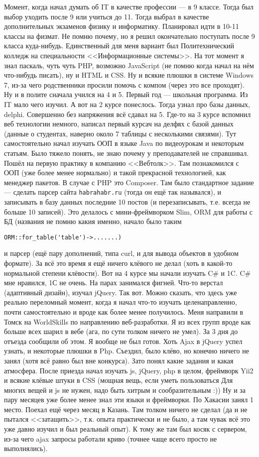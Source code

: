 Момент, когда начал думать об IT в качестве профессии --- в 9 классе. Тогда был выбор уходить после 9 или учиться до 11. Тогда выбрал в качестве дополнительных экзаменов физику и информатику.
Планировал идти в 10-11 классы на физмат. Не помню почему, но я решил окончательно поступать после 9 класса куда-нибудь. Единственный для меня вариант был Политехнический колледж на специальности <<Информационные системы>>.
На тот момент я знал паскаль, чуть чуть PHP, возможно JavaScript (не помню когда начал на нём что-нибудь писать), ну и HTML и CSS. Ну и всякие плюшки в системе Windows 7, из-за чего родственники просили помочь с компом (через это все проходят).
Ну и в полите сначала учился на 4 и 5. Первый год --- школьная программа. Из IT мало чего изучил. А вот на 2 курсе понеслось. Тогда узнал про базы данных, delphi.
Совершенно без напряжения всё сдавал на 5. Где-то на 3 курсе вспомнил веб технологии немного, написал первый курсач на делфях с базой данных (данные о студентах, наверно около 7 таблицы с несколькими связями).
Тут самостоятельно начал изучать ООП в языке Java по видеоурокам и некоторым статьям. Было тяжело понять, не знаю почему у преподавателей не справшивал.
Пошёл на первую практику в компанию <<Вебтолк>>. Там познакомился с ООП (уже более менее нормально) и такой прекрасной технологией, как менеджер пакетов. В случае с PHP это Composer.
Там было стандартное задание --- сделать парсер сайта \verb|habrahabr.ru| (тогда он ещё так назывался), и записывать в базу данных последние 10 постов (и перезаписывать, т.е. всегда не больше 10 записей).
Это делалось с мини-фреймворком Slim, ORM для работы с БД (названия не помню какия именно, начало было таким
\begin{verbatim}
ORM::for_table('table')->.......)
\end{verbatim}
и парсер (ещё пару дополнений, типа curl, и для вывода объектов в удобном формате).
За всё это время я ещё ничего клёвого не делал (хоть в какой-то нормальной степени клёвости).
Вот на 4 курсе мы начали изучать C\# и 1C. C\# мне нравился, 1С не очень. На парах занимался фигней. Что-то верстал (адаптивный дизайн), изучал jQuery.
Так вот. Можно сказать, что здесь уже реально переломный момент, когда я начал что-то изучать целенаправленно, почти самостоятельно и вроде как более менее получилось.
Меня направили в Томск на WorldSkills по направлению веб-разработки. Я из всех групп вроде как больше всех шарил в вебе (ага, по сути толком ничего не умел). 
За 3 дня до отъезда сообщили об этом. Я вообще не был готов. Хоть Ajax в jQuery успел узнать, и некоторые плюшки в Php. Съездил, было клёво, но конечно ничего не занял (хотя всё равно был вне конкурса).
Зато понял какие задания и какая атмосфера. После приезда начал изучать js, jQuery, php в целом, фреймворк Yii2 и всякие клёвые штуки в CSS (мощная вещь, если уметь пользоваться Для многих вещей и js не нужен, надо быть хитрым и сообразительным :))
Ну и за пару месяцев уже более менее знал эти языки и фреймворки.
По Хакасии занял 1 место. Поехал ещё через месяц в Казань. Там толком ничего не сделал (да и не пытался <<затащить>>, т.к. опыта практически и не было, а там чувак всё это уже давно изучил и был реальный опыт).
К тому же там был косяк с сервером, из-за чего ajax запросы работали криво (точнее чаще всего просто не выполнялись).

